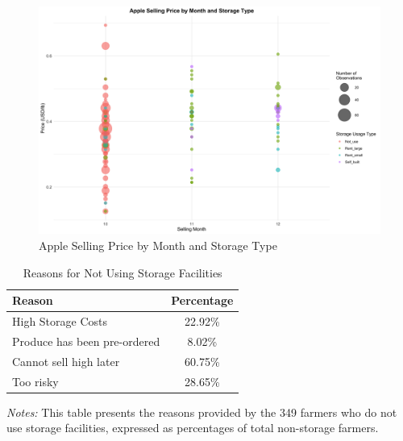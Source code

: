\documentclass[12pt]{article}
\begin{document}
\begin{figure}[H]
\centering
\includegraphics[width=1\textwidth]{figures/apple_price_bubble_plot.png}
\caption{Apple Selling Price by Month and Storage Type}
\label{Figure: selling price bubble}
\end{figure}




\begin{table}[H]
    \centering
    \footnotesize
    \begin{threeparttable}
        \caption{Reasons for Not Using Storage Facilities}
        \label{tab:non_storage_reasons}
        \begin{tabular}{lc}
            \toprule
            \textbf{Reason} & \textbf{Percentage} \\
            \midrule
            High Storage Costs & 22.92\% \\
            Produce has been pre-ordered & 8.02\% \\
            Cannot sell high later & 60.75\% \\
            Too risky & 28.65\% \\
            \bottomrule
        \end{tabular}
        \begin{tablenotes}
            \item \textit{Notes:} This table presents the reasons provided by the 349 farmers who do not use storage facilities, expressed as percentages of total non-storage farmers.
        \end{tablenotes}
    \end{threeparttable}
\end{table}
\end{document}
